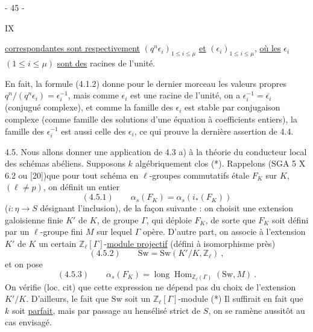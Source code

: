 \begin{center}- 45 -\end{center}\hfill IX

\uline{correspondantes sont respectivement} $(q^n\epsilon_i)_{1\leq i\leq\mu}$ \uline{et} $(\epsilon_i)_{1\leq i\leq\mu}$, \uline{où les} $\epsilon_i$ $(1\leq i\leq\mu)$ \uline{sont des} racines de l'unité.

En fait, la formule (4.1.2) donne pour le dernier morceau les valeurs propres $q^n/(q^n\epsilon_i)=\epsilon_i^{-1}$, mais comme $\epsilon_i$ est une racine de l'unité, on a $\epsilon_i^{-1}=\overline{\epsilon_i}$ (conjugué complexe), et comme la famille des $\epsilon_i$ est stable par conjugaison complexe (comme famille des solutions d'une équation à coefficients entiers), la famille des $\epsilon_i^{-1}$ est aussi celle des $\epsilon_i$, ce qui prouve la dernière assertion de 4.4.

4.5. Nous allons donner une application de 4.3 a) à la théorie du conducteur local des schémas abéliens. Supposons $k$ algébriquement clos (*). Rappelons (SGA 5 X 6.2 ou [20])que pour tout schéma en $\ell$-groupes commutatifs étale $F_K$ sur $K$, $(\ell\ne p)$, on définit un entier
\[
 (4.5.1)\qquad\alpha_s(F_K)=\alpha_s(i_*(F_K))
\]
($i:\eta\longrightarrow S$ désignant l'inclusion), de la façon suivante : on choisit une extension galoisienne finie $K'$ de $K$, de groupe $\Gamma$, qui déploie $F_K$, de sorte que $F_K$ soit défini par un $\ell$-groupe fini $M$ sur lequel $\Gamma$ opère.
D'autre part, on associe à l'extension $K'$ de $K$ un certain $\mathbb Z_\ell[\Gamma]$-\uline{module projectif} (défini à isomorphisme près)
\[
 (4.5.2)\qquad\mathrm{Sw}=\mathrm{Sw}(K'/K,\mathbb Z_\ell)\ ,
\]
et on pose
\[
 (4.5.3)\qquad\alpha_s(F_K)=\operatorname{long}\operatorname{Hom}_{\mathbb Z_\ell(\Gamma)}(\mathrm{Sw},M)\ .
\]
On vérifie (loc. cit) que cette expression ne dépend pas du choix de l'extension $K'/K$. D'ailleurs, le fait que $\mathrm{Sw}$ soit un $\mathbb Z_\ell[\Gamma]$-module
(*) Il suffirait en fait que $k$ soit \uline{parfait}, mais par passage au hensélisé strict de $S$, on se ramène aussitôt au cas envisagé.
